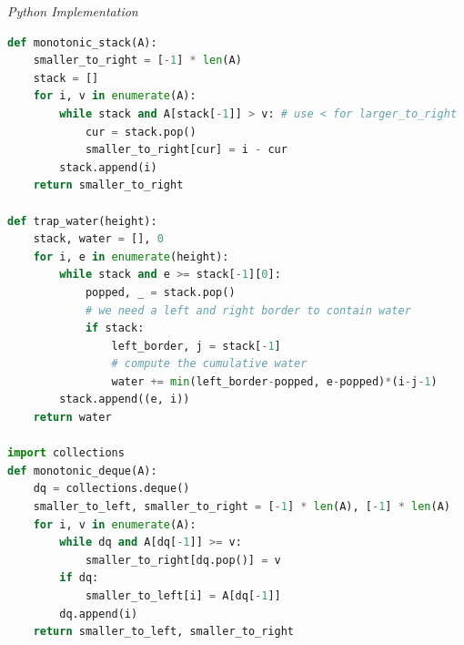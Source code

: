 \documentclass{article}
\begin{document}
\vspace{8pt} \emph{Python Implementation}
\begin{lstlisting}[language=Python]
def monotonic_stack(A):
    smaller_to_right = [-1] * len(A)
    stack = []
    for i, v in enumerate(A):
        while stack and A[stack[-1]] > v: # use < for larger_to_right
            cur = stack.pop()
            smaller_to_right[cur] = i - cur
        stack.append(i)
    return smaller_to_right

def trap_water(height):
    stack, water = [], 0
    for i, e in enumerate(height):
        while stack and e >= stack[-1][0]:
            popped, _ = stack.pop()
            # we need a left and right border to contain water
            if stack:
                left_border, j = stack[-1]
                # compute the cumulative water
                water += min(left_border-popped, e-popped)*(i-j-1)
        stack.append((e, i))
    return water

import collections
def monotonic_deque(A):
    dq = collections.deque()
    smaller_to_left, smaller_to_right = [-1] * len(A), [-1] * len(A)
    for i, v in enumerate(A):
        while dq and A[dq[-1]] >= v: 
            smaller_to_right[dq.pop()] = v 
        if dq:  
            smaller_to_left[i] = A[dq[-1]]
        dq.append(i)
    return smaller_to_left, smaller_to_right
\end{lstlisting}
\end{document}
